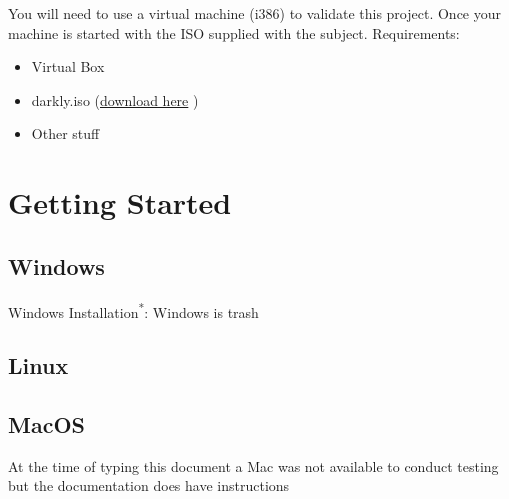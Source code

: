 You will need to use a virtual machine (i386) to validate this project. Once your
machine is started with the ISO supplied with the subject.
Requirements:
\begin{itemize}
    \item Virtual Box
    \item darkly.iso (\href{https://drive.google.com/file/d/145dbZHjZWyMiRscj-72jE3n5PM5vXyB9/view?usp=sharing}{download here} )
    \item Other stuff
\end{itemize}

\section{Getting Started}

\subsection{Windows}
Windows Installation\textsuperscript{*}: Windows is trash\cite{Docker:Windows_Install}


\let\thefootnote\relax{}
\let\thefootnote\relax{}

\subsection{Linux}



\subsection{MacOS}
At the time of typing this document a Mac was not available to conduct testing
but the documentation\cite{Docker:Mac_Install} does have instructions


